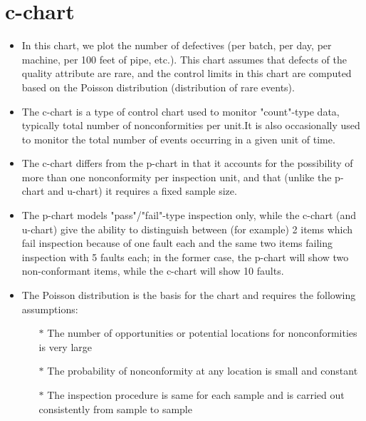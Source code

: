 \documentclass[a4paper,12pt]{article}
\begin{document}
\section{c-chart}



\begin{itemize}
\item In this chart, we plot the number of defectives (per batch, per day, per machine, per 100 feet of pipe, etc.). This chart assumes that defects of the quality attribute are rare, and the control limits in this chart are computed based on the Poisson distribution (distribution of rare events).

\item The c-chart is a type of control chart used to monitor "count"-type data, typically total number of nonconformities per unit.It is also occasionally used to monitor the total number of events occurring in a given unit of time.

\item The c-chart differs from the p-chart in that it accounts for the possibility of more than one nonconformity per inspection unit, and that (unlike the p-chart and u-chart) it requires a fixed sample size. 

\item The p-chart models "pass"/"fail"-type inspection only, while the c-chart (and u-chart) give the ability to distinguish between (for example) 2 items which fail inspection because of one fault each and the same two items failing inspection with 5 faults each; in the former case, the p-chart will show two non-conformant items, while the c-chart will show 10 faults.

\item The Poisson distribution is the basis for the chart and requires the following assumptions:
\begin{itemize}
\item[$\ast$] The number of opportunities or potential locations for nonconformities is very large
\item[$\ast$] The probability of nonconformity at any location is small and constant
\item[$\ast$] The inspection procedure is same for each sample and is carried out consistently from sample to sample
\end{itemize}
\end{itemize}
\newpage
\end{document}
